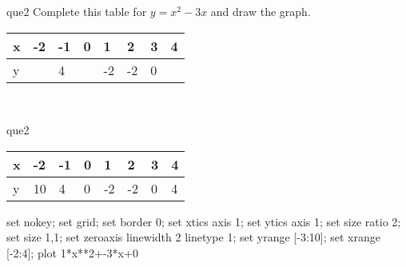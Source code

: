 \documentclass[13.5pt, varwidth=true]{beamer}
\begin{document}
\begin{frame}[shrink=19,fragile]
	\begin{beamercolorbox}[rounded=true, left, shadow=true,wd=14.8cm]{que2}
		 Complete this table for $y = x^{2} - 3x$ and draw the graph. \\[0.3cm] \renewcommand{\arraystretch}{1.2}\begin{tabular}{|C|C|C|C|C|C|C|C|} \hline x & -2 & -1 & 0 & 1 & 2 & 3 & 4 \\ \hline y &  & 4 &  & -2 & -2 & 0 & \\ \hline \end{tabular}\\[0.3cm]
	\end{beamercolorbox}
\end{frame}
\begin{frame}[shrink=19,fragile]
	\begin{beamercolorbox}[rounded=true, left, shadow=true,wd=14.8cm]{que2}
		\renewcommand{\arraystretch}{1.2}\begin{tabular}{|C|C|C|C|C|C|C|C|} \hline x & -2 & -1 & 0 & 1 & 2 & 3 & 4 \\ \hline y & 10 & 4 & 0 & -2 & -2 & 0 & 4\\ \hline \end{tabular}\begin{gnuplot}[terminal=pdf] set nokey; set grid; set border 0; set xtics axis 1; set ytics axis 1; set size ratio 2; set size 1,1; set zeroaxis linewidth 2 linetype 1; set yrange [-3:10]; set xrange [-2:4]; plot 1*x**2+-3*x+0 \end{gnuplot}
	\end{beamercolorbox}
\end{frame}
\end{document}
